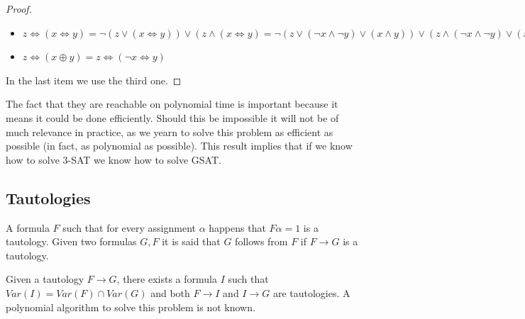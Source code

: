 \begin{proof}
\begin{itemize}
    \item $z \iff( x \iff y ) =  \neg ( z \vee ( x \iff y ) ) \vee (z \wedge ( x \iff y ) = \neg ( z \vee (\neg  x \wedge \neg  y) \vee (x \wedge y)) \vee (z \wedge(\neg  x \wedge \neg  y) \vee (x \wedge y))  )=(\neg  z \wedge \neg  (\neg  x \wedge \neg  y) \wedge \neg  (x \wedge y)) \vee (z \wedge(\neg  x \wedge \neg  y) \vee (x \wedge y))  )=(\neg  z \wedge  (x \vee  y) \wedge (\neg  x \vee \neg  y)) \vee (z \wedge(\neg  x \wedge \neg  y) \vee (x \wedge y))  )=z \vee ( \neg  x \wedge \neg  y) = (\neg x \vee \neg y \vee z) \wedge (\neg x \vee \neg z \vee y) \wedge (y \vee z \vee x) \wedge (y \vee \neg y \vee x) \wedge (\neg z \vee z \vee x) \wedge (\neg z \vee \neg y \vee x)$
      
    \item $z \iff( x \oplus y ) =  z \iff(\neg  x \iff y )  $	

    \end{itemize}
    In the last item we use the third one.
    
  \end{proof}

  The fact that they are reachable on polynomial time is important because it means it could be done efficiently. Should this be impossible it will not be of much relevance in practice, as we yearn to solve this problem as efficient as possible (in fact, as polynomial as possible). This result implies that if we know how to solve $3$-SAT we know how to solve GSAT.


  \subsection{Tautologies}

  \begin{definition}
    A formula $F$ such that for every assignment  $\alpha$  happens that $F\alpha=1$ is a tautology. Given two formulas $G,F$ it is said that $G$ follows from $F$ if $F\to G$ is a tautology. 
  \end{definition}

  \begin{proposition}
    Given a tautology $F \to G$, there exists a formula $I$ such that $Var(I) = Var(F)\cap Var(G)$ and both $F\to I$ and $I \to G$ are tautologies. A polynomial algorithm to solve this problem is not known. 
  \end{proposition}

